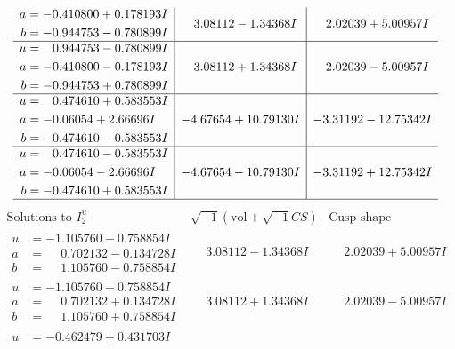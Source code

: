 \documentclass[1p]{elsarticle_modified}
\theoremstyle{definition}
\newcommand{\I}{\sqrt{-1}}
\begin{document}
$$\begin{array}{c|c|c}
\begin{aligned}
a &= -0.410800 + 0.178193 I \\
b &= -0.944753 - 0.780899 I\end{aligned}
 & \phantom{-}3.08112 - 1.34368 I & \phantom{-}2.02039 + 5.00957 I \\ \hline\begin{aligned}
u &= \phantom{-}0.944753 - 0.780899 I \\
a &= -0.410800 - 0.178193 I \\
b &= -0.944753 + 0.780899 I\end{aligned}
 & \phantom{-}3.08112 + 1.34368 I & \phantom{-}2.02039 - 5.00957 I \\ \hline\begin{aligned}
u &= \phantom{-}0.474610 + 0.583553 I \\
a &= -0.06054 + 2.66696 I \\
b &= -0.474610 - 0.583553 I\end{aligned}
 & -4.67654 + 10.79130 I & -3.31192 - 12.75342 I \\ \hline\begin{aligned}
u &= \phantom{-}0.474610 - 0.583553 I \\
a &= -0.06054 - 2.66696 I \\
b &= -0.474610 + 0.583553 I\end{aligned}
 & -4.67654 - 10.79130 I & -3.31192 + 12.75342 I\\
 \hline 
 \end{array}$$\newpage$$\begin{array}{c|c|c}  
\text{Solutions to }I^u_{2}& \I (\text{vol} + \sqrt{-1}CS) & \text{Cusp shape}\\
 \hline 
\begin{aligned}
u &= -1.105760 + 0.758854 I \\
a &= \phantom{-}0.702132 - 0.134728 I \\
b &= \phantom{-}1.105760 - 0.758854 I\end{aligned}
 & \phantom{-}3.08112 - 1.34368 I & \phantom{-}2.02039 + 5.00957 I \\ \hline\begin{aligned}
u &= -1.105760 - 0.758854 I \\
a &= \phantom{-}0.702132 + 0.134728 I \\
b &= \phantom{-}1.105760 + 0.758854 I\end{aligned}
 & \phantom{-}3.08112 + 1.34368 I & \phantom{-}2.02039 - 5.00957 I \\ \hline\begin{aligned}
u &= -0.462479 + 0.431703 I \\

\end{aligned}
\end{array}$$
\end{document}
